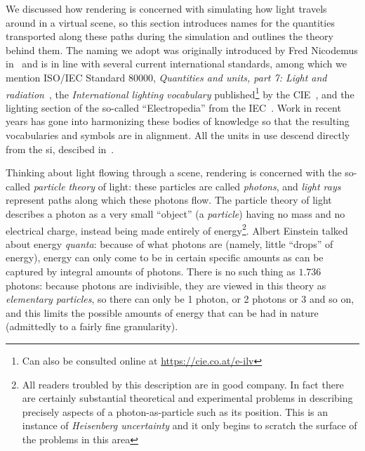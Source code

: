 \noindent We discussed how \gls{rendering} is concerned with simulating how light travels around in 
a \gls{virtual scene}, so this section introduces names for the quantities transported 
along these paths during the simulation and outlines the theory behind them. 
The naming we adopt was originally introduced by Fred Nicodemus in~\cite{nicodemus77} and
is in line with several current international standards,  
among which we mention \gls{ISO}/\gls{IEC} Standard 80000, 
\emph{Quantities and units, part 7: Light and radiation}~\cite{iso:80000-7:2019}, 
the \emph{International lighting vocabulary} published\footnote{Can also be consulted 
	online at \url{https://cie.co.at/e-ilv}} by the \gls{CIE}~\cite{cie:s017.2020},
and the lighting section of the so-called ``Electropedia'' from the \gls{IEC}~\cite{iec:60050-845:2020}.
Work in recent years has gone into harmonizing these bodies of knowledge so that the resulting 
vocabularies and symbols are in alignment. All the units in use descend directly
from the \gls{si}, descibed in~\cite{bipm:si.2019}.

Thinking about light flowing through a scene, rendering is concerned with the so-called
\textsl{particle theory} of light: these particles are called \textsl{photons}, 
and \textsl{light rays} represent paths along which these photons flow.
The particle theory of light describes a photon as a very small ``object'' 
(a \textsl{particle}) having no mass and no electrical charge, 
instead being made entirely of energy\footnote{
	All readers troubled by this description are in good company. In fact there are 
	certainly substantial theoretical and experimental problems in describing precisely
 	aspects of a photon-as-particle such as its position. 
 	This is an instance of \textsl{Heisenberg uncertainty}
 	and it only begins to scratch the surface of the problems in this area}. 
Albert Einstein talked about energy \textsl{quanta}: because of what photons are 
(namely, little ``drops'' of energy), 
energy can only come to be in certain specific amounts as can be captured by integral 
amounts of photons. There is no such thing as $1.736$ photons: because photons are indivisible, 
they are viewed in this theory as \textsl{elementary particles}, 
so there can only be 1 photon, or 2 photons or 3 and so on, and this limits the possible
amounts of energy that can be had in nature (admittedly to a fairly fine granularity).

